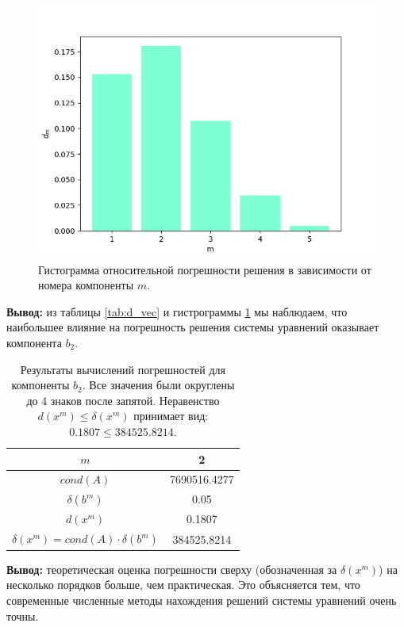 \documentclass[12pt]{article}%
\begin{document}
\begin{figure}[h]
    \centering
    \includegraphics[width=\linewidth]{problem1_precision.png}
    \caption{Гистограмма относительной погрешности решения в зависимости от номера компоненты $m$.}
    \label{fig:d_vec}
\end{figure}
\FloatBarrier

\textbf{Вывод:} из таблицы \ref{tab:d_vec} и гистрограммы \ref{fig:d_vec} мы наблюдаем, что наибольшее влияние на погрешность решения системы уравнений оказывает компонента $b_2$.

\begin{table}[h]
    \centering
    \begin{tabular}{|c|c|}
        \hline $m$                                      & 2             \\
        \hline $cond(A)$                                & 7690516.4277  \\
        \hline $\delta(b^m)$                            & 0.05          \\
        \hline $d(x^m)$                                 & 0.1807        \\
        \hline $\delta(x^m) = cond(A) \cdot \delta(b^m)$ & 384525.8214  \\
        \hline
    \end{tabular}
    \caption{Результаты вычислений погрешностей для компоненты $b_2$. Все значения были округлены до 4 знаков после запятой. Неравенство $d(x^m) \leqslant \delta(x^m)$ принимает вид: $0.1807 \leqslant 384525.8214$.}
    \label{tab:my_label}
\end{table}
\FloatBarrier
\textbf{Вывод:} теоретическая оценка погрешности сверху (обозначенная за $\delta(x^m)$) на несколько порядков больше, чем практическая. Это объясняется тем, что современные численные методы нахождения решений системы уравнений очень точны.
\end{document}
